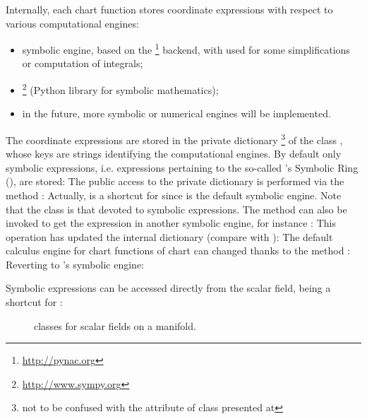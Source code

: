 Internally, each chart function stores coordinate expressions with respect
to various computational engines:
\begin{itemize}
\item \Sage{} symbolic engine, based on the \footnote{\url{http://pynac.org}} backend, with  used for some simplifications
or computation of integrals;
\item {}\footnote{\url{http://www.sympy.org}} (Python library for symbolic mathematics);
\item in the future, more symbolic or numerical engines will be implemented.
\end{itemize}
The coordinate expressions are stored in the private dictionary \footnote{not to be confused with
the attribute  of class  presented
at }
of the class ,
whose keys are strings identifying the computational engines. By default
only \Sage{} symbolic expressions, i.e. expressions pertaining
to the so-called \Sage{}'s Symbolic Ring (),
are stored:
The public access to the private dictionary  is performed via the
method :
Actually,  is a shortcut for  since
 is the default symbolic engine. Note that the class
 is that devoted to \Sage{} symbolic expressions.
The method  can also be invoked to get the expression in
another symbolic engine, for instance :
This operation has updated the internal dictionary 
(compare with ):
The default calculus engine for chart functions of chart  can
changed thanks to the method :
Reverting to \Sage{}'s symbolic engine:

Symbolic expressions can be accessed directly from the scalar field,
 being a shortcut for :

\begin{figure}
\begin{center}

\end{center}
\caption{\label{f:man:scalar_classes}\footnotesize
\Sage{} classes for scalar fields on a manifold.}
\end{figure}

